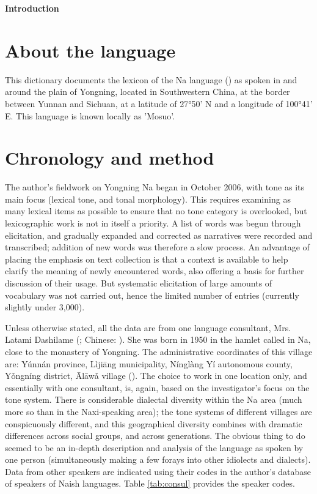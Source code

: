 	{\LARGE \textbf{Introduction}}
	\section{About the language} \label{sec:language}

This dictionary documents the lexicon of the Na language () as spoken in and around the plain of Yongning, located in Southwestern China, at the border between Yunnan and Sichuan, at a latitude of 27°50’ N and a longitude of 100°41’ E. This language is known locally as 'Mosuo'. 

	\section{Chronology and method} \label{sec:method}

The author's fieldwork on Yongning Na began in October 2006, with tone as its main focus (lexical tone, and tonal morphology). This requires examining as many lexical items as possible to ensure that no tone category is overlooked, but lexicographic work is not in itself a priority. A list of words was begun through elicitation, and gradually expanded and corrected as narratives were recorded and transcribed; addition of new words was therefore a slow process. An advantage of placing the emphasis on text collection is that a context is available to help clarify the meaning of newly encountered words, also offering a basis for further discussion of their usage. But systematic elicitation of large amounts of vocabulary was not carried out, hence the limited number of entries (currently slightly under 3,000). 

Unless otherwise stated, all the data are from one language consultant, Mrs. Latami Dashilame (; Chinese: ). She was born in 1950 in the hamlet called  in Na, close to the monastery of Yongning. The administrative coordinates of this village are: Yúnnán province, Lìjiāng municipality, Nínglàng Yí autonomous county, Yǒngníng district, Ālāwǎ village (). The choice to work in one location only, and essentially with one consultant, is, again, based on the investigator's focus on the tone system. There is considerable dialectal diversity within the Na area (much more so than in the Naxi-speaking area); the tone systems of different villages are conspicuously different, and this geographical diversity combines with dramatic differences across social groups, and across generations. The obvious thing to do seemed to be an in-depth description and analysis of the language as spoken by one person (simultaneously making a few forays into other idiolects and dialects). Data from other speakers are indicated using their codes in the author's database of speakers of Naish languages. Table \ref{tab:consul} provides the speaker codes.

